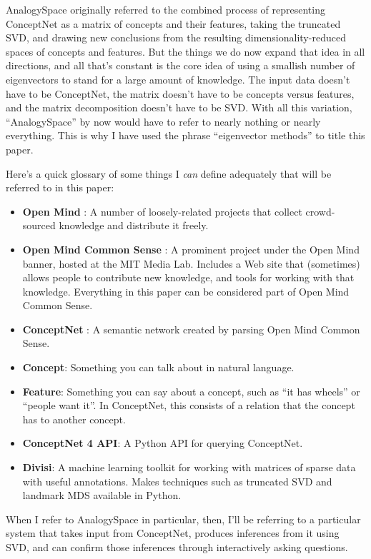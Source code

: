 \documentclass[11pt]{article}
\newenvironment{mylist}{
\begin{itemize}
  \setlength{\itemsep}{1pt}
  \setlength{\parskip}{0pt}
  \setlength{\parsep}{0pt}}{\end{itemize}
}
\begin{document}
AnalogySpace originally referred to the combined process of representing
ConceptNet as a matrix of concepts and their features, taking the truncated
SVD, and drawing new conclusions from the resulting dimensionality-reduced
spaces of concepts and features. But the things we do now expand that idea in all directions, and all that's
constant is the core idea of using a smallish number of eigenvectors to stand
for a large amount of knowledge. The input data doesn't have to be ConceptNet,
the matrix doesn't have to be concepts versus features, and the matrix
decomposition doesn't have to be SVD. With all this variation, ``AnalogySpace''
by now would have to refer to nearly nothing or nearly everything. This is why
I have used the phrase ``eigenvector methods'' to title this paper.

Here's a quick glossary of some things I {\em can} define adequately that will
be referred to in this paper:

\begin{mylist}
\item {\bf Open Mind} \cite{openmind}: A number of loosely-related projects that collect crowd-sourced knowledge and distribute it freely.
\item {\bf Open Mind Common Sense} \cite{omcs2}: A prominent project under the Open
Mind banner, hosted at the MIT Media Lab. Includes a Web site that (sometimes)
allows people to contribute new knowledge, and tools for working with that
knowledge. Everything in this paper can be considered part of Open Mind Common
Sense.
\item {\bf ConceptNet} \cite{cnet2}: A semantic network created by parsing Open Mind Common Sense.
\item {\bf Concept}: Something you can talk about in natural language.
\item {\bf Feature}: Something you can say about a concept, such as ``it has
wheels'' or ``people want it''. In ConceptNet, this consists of a relation that
the concept has to another concept.
\item {\bf ConceptNet 4 API}: A Python API for querying ConceptNet.
\item {\bf Divisi}: A machine learning toolkit for working with matrices of
sparse data with useful annotations. Makes techniques such as truncated SVD and
landmark MDS available in Python.
\end{mylist}

When I refer to AnalogySpace in particular, then, I'll be referring to a particular system that takes input from ConceptNet, produces inferences from it using SVD, and can confirm those inferences through interactively asking questions.
\end{document}
